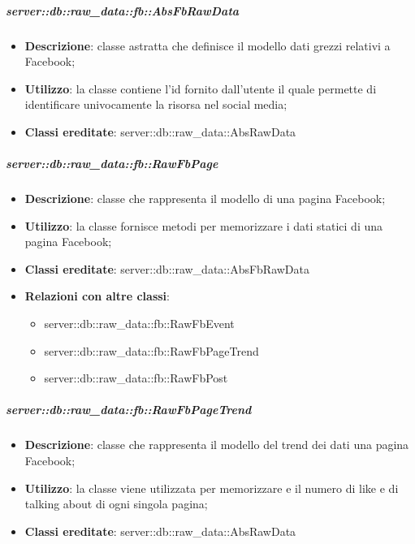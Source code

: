 			\subparagraph{server::db::raw\_data::fb::AbsFbRawData} %
			\label{subp:server_db_raw_data_fb_absfbrawdata}
				\begin{itemize}
					\item \textbf{Descrizione}: classe astratta che definisce il modello dati grezzi relativi a Facebook;
					\item \textbf{Utilizzo}: la classe contiene l'id fornito dall'utente il quale permette di identificare univocamente la risorsa nel social media;
					\item \textbf{Classi ereditate}: server::db::raw\_data::AbsRawData
				\end{itemize}


			\subparagraph{server::db::raw\_data::fb::RawFbPage} %
			\label{subp:server_db_raw_data_fb_rawfbpage}
				\begin{itemize}
					\item \textbf{Descrizione}: classe che rappresenta il modello di una pagina Facebook;
					\item \textbf{Utilizzo}: la classe fornisce metodi per memorizzare i dati statici di una pagina Facebook;
					\item \textbf{Classi ereditate}: server::db::raw\_data::AbsFbRawData
					\item \textbf{Relazioni con altre classi}:
						\begin{itemize}
							\item server::db::raw\_data::fb::RawFbEvent
							\item server::db::raw\_data::fb::RawFbPageTrend
							\item server::db::raw\_data::fb::RawFbPost
						\end{itemize}
				\end{itemize}

			\subparagraph{server::db::raw\_data::fb::RawFbPageTrend} %
			\label{subp:server_db_raw_data_fb_rowfbpagetrend}
				\begin{itemize}
					\item \textbf{Descrizione}: classe che rappresenta il modello del trend dei dati una pagina Facebook;
					\item \textbf{Utilizzo}: la classe viene utilizzata per memorizzare e il numero di like e di talking about di ogni singola pagina;
					\item \textbf{Classi ereditate}: server::db::raw\_data::AbsRawData
				\end{itemize}


